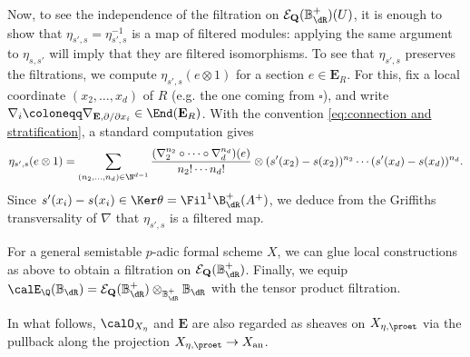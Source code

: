 \begin{construction}
Now, to see the independence of the filtration on $\mathcal{E}_{\mathbf{Q}}(\mathbb{B}_{\dR}^+)(U)$, it is enough to show that $\eta_{s',s}=\eta_{s',s}^{-1}$ is a map of filtered modules: applying the same argument to $\eta_{s,s'}$ will imply that they are filtered isomorphisms.
To see that $\eta_{s',s}$ preserves the filtrations, 
we compute $\eta_{s',s}(e\otimes 1)$ for a section $e\in\mathbf{E}_R$. For this, fix a local coordinate $(x_2,\dots,x_d)$ of $R$ (e.g. the one coming from $\square$), and write $\nabla_i\coloneqq \nabla_{\mathbf{E},\partial/\partial x_{i}}\in \End(\mathbf{E}_R)$. With the convention \eqref{eq:connection and stratification}, a standard computation gives
\[
\eta_{s',s}(e\otimes 1)
=\sum_{(n_2,\ldots,n_d)\in\N^{d-1}}\frac{(\nabla_2^{n_2}\circ\cdots\circ \nabla_d^{n_d})(e)}{n_2!\cdots n_d!}\otimes (s'(x_2)-s(x_2))^{n_2}\cdots (s'(x_d)-s(x_d))^{n_d}.
\]
Since $s'(x_i)-s(x_i)\in \Ker\theta=\Fil^1\B_{\dR}^+(A^+)$, we deduce from the Griffiths transversality of $\nabla$ that $\eta_{s',s}$ is a filtered map. 

For a general semistable $p$-adic formal scheme $X$, we can glue local constructions as above to obtain a filtration on $\mathcal{E}_{\mathbf{Q}}(\mathbb{B}^+_{\dR})$. Finally, we equip $\calE_\Q(\mathbb{B}_\dR)=\mathcal{E}_{\mathbf{Q}}(\mathbb{B}^+_{\dR})\otimes_{\mathbb{B}^+_{\dR}}\mathbb{B}_{\dR}$ with the tensor product filtration.
\end{construction}

In what follows, $\calO_{X_\eta}$ and $\mathbf{E}$ are also regarded as sheaves on $X_{\eta,\proet}$ via the pullback along the projection $X_{\eta,\proet}\rightarrow X_{\mathrm{an}}$.

